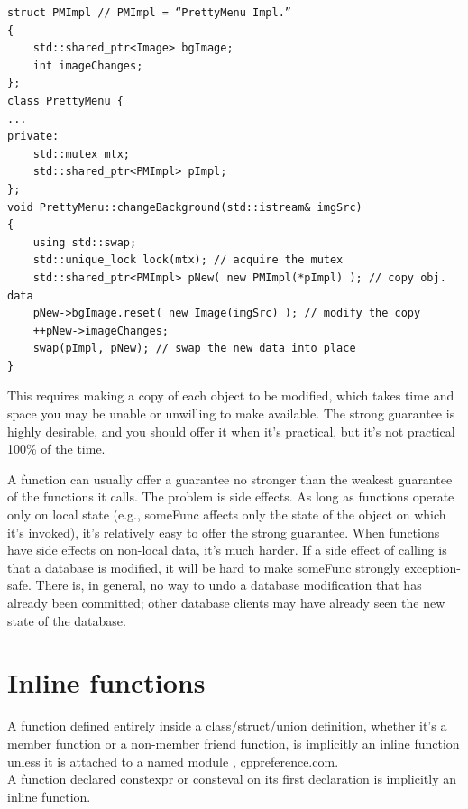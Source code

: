 \documentclass[a4paper,12pt,notitlepage]{article}
\begin{document}
\begin{verbatim}
struct PMImpl // PMImpl = “PrettyMenu Impl.”
{
    std::shared_ptr<Image> bgImage;
    int imageChanges;
};
class PrettyMenu {
...
private:
    std::mutex mtx;
    std::shared_ptr<PMImpl> pImpl;
};
void PrettyMenu::changeBackground(std::istream& imgSrc)
{
    using std::swap;
    std::unique_lock lock(mtx); // acquire the mutex
    std::shared_ptr<PMImpl> pNew( new PMImpl(*pImpl) ); // copy obj. data
    pNew->bgImage.reset( new Image(imgSrc) ); // modify the copy
    ++pNew->imageChanges;
    swap(pImpl, pNew); // swap the new data into place
}
\end{verbatim}

This requires making a copy of each object to be modified, which takes time and space you may be
unable or unwilling to make available. The strong guarantee is highly desirable, and you should
offer it when it's practical, but it's not practical 100\% of the time.

A function can usually offer a guarantee no stronger than the weakest guarantee of the functions it
calls. The problem is side effects. As long as functions operate only on local state (e.g., someFunc
affects only the state of the object on which it's invoked), it's relatively easy to offer the
strong guarantee. When functions have side effects on non-local data, it's much harder. If a side
effect of calling is that a database is modified, it will be hard to make someFunc strongly
exception-safe. There is, in general, no way to undo a database modification that has already been
committed; other database clients may have already seen the new state of the database.


\section{Inline functions}

A function defined entirely inside a class/struct/union definition, whether it's a member function
or a non-member friend function, is implicitly an inline function unless it is attached to a named
module \cite{Meyers_eff}, \href{https://en.cppreference.com/w/cpp/language/inline}{cppreference.com}. \\

\noindent
A function declared constexpr or consteval on its first declaration is implicitly an inline function.\\
\end{document}

